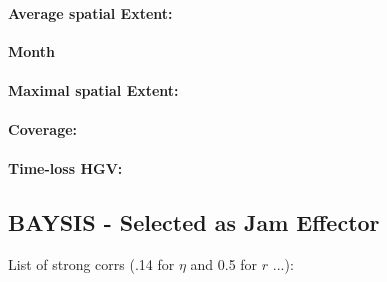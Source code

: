 \paragraph{Average spatial Extent:}

\large
\centerline{\textbf{Month}}
\normalsize

\paragraph{Maximal spatial Extent:}
\paragraph{Coverage:}
\paragraph{Time-loss HGV:}

\subsection{BAYSIS - Selected as Jam Effector}

List of strong corrs (.14 for $\eta$ and 0.5 for $r$ ...):

